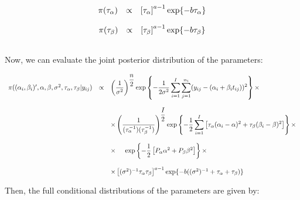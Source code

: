 \documentclass{article}
\begin{document}
\begin{equation*}
\begin{array}{lcl ll }
\pi(\tau_\alpha) & \propto & \left[\tau_\alpha \right]^{a -1} \mbox{exp} \{ - b\tau_\alpha\}

 \end{array}
\end{equation*}

\begin{equation*}
\begin{array}{lcl ll }
\pi(\tau_\beta) & \propto & \left[\tau_\beta \right]^{a -1} \mbox{exp} \{ - b\tau_\beta\} \\ \\

 \end{array}
\end{equation*}

Now, we can evaluate the joint posterior distribution of the parameters:

\begin{equation*}
\begin{array}{lcl ll }

\pi((\alpha_i, \beta_i)',\alpha, \beta, \sigma^2, \tau_\alpha, \tau_\beta |y_{ij}) & \propto & \left(\dfrac{1}{\sigma^2}\right)^{\dfrac{n}{2}}\mbox{exp}\left\{ - \dfrac{1}{2\sigma^2}\displaystyle\sum_{i=1}^{I}\displaystyle\sum_{j=1}^{n_i}(y_{ij} - (\alpha_i + \beta_i t_{ij}))^2\right\} \times \\ \\

& & \times \left(\dfrac{1}{(\tau_{\alpha}^{-1})(\tau_{\beta}^{-1})}\right)^{\dfrac{I}{2}}\mbox{exp}\left\{ - \dfrac{1}{2} 
\displaystyle\sum_{i=1}^{I} \left[ \tau_{\alpha}(\alpha_{i} - \alpha)^2 + \tau_{\beta}(\beta_{i} - \beta)^2 \right]\right\} \times \\ \\

& & \times \hspace{0.5cm} \mbox{exp}\left\{ - \dfrac{1}{2} \left[ P_{\alpha}\alpha^2 + P_{\beta}\beta^2\right] \right\} \times \\ \\

& & \times \left[ (\sigma^2)^{-1} \tau_\alpha \tau_\beta \right]^{a -1} \mbox{exp} \{ - b((\sigma^2)^{-1} + \tau_\alpha + \tau_\beta)\}

 \end{array}
\end{equation*}

Then, the full conditional distributions of the parameters are given by:
\end{document}
